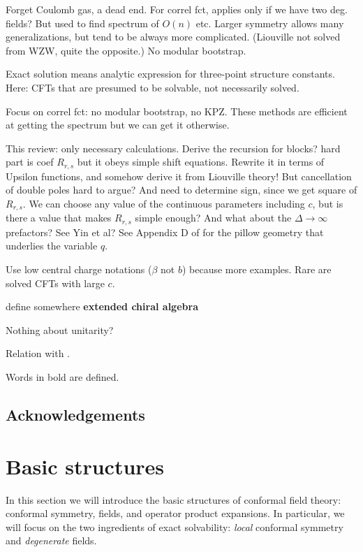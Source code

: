 \documentclass[12pt, a4paper]{article}
\theoremstyle{break}
\begin{document}
Forget Coulomb gas, a dead end. For correl fct, applies only if we have two deg. fields? But used to find spectrum of $O(n)$ etc. Larger symmetry allows many generalizations, but tend to be always more complicated. (Liouville not solved from WZW, quite the opposite.) No modular bootstrap. 

Exact solution means analytic expression for three-point structure constants. Here: CFTs that are presumed to be solvable, not necessarily solved. 

Focus on correl fct: no modular bootstrap, no KPZ. These methods are efficient at getting the spectrum but we can get it otherwise. 

This review: only necessary calculations. Derive the recursion for blocks? hard part is coef $R_{r,s}$ but it obeys simple shift equations. Rewrite it in terms of Upsilon functions, and somehow derive it from Liouville theory! But cancellation of double poles hard to argue? And need to determine sign, since we get square of $R_{r,s}$. We can choose any value of the continuous parameters including $c$, but is there a value that makes $R_{r,s}$ simple enough? And what about the $\Delta\to\infty$ prefactors? See Yin et al? See Appendix D of \cite{msz15} for the pillow geometry that underlies the variable $q$.

Use low central charge notations ($\beta$ not $b$) because more examples. Rare are solved CFTs with large $c$.

define somewhere \textbf{extended chiral algebra}

Nothing about unitarity?

Relation with \cite{rib16}.

Words in bold are defined.

\subsection*{Acknowledgements}



\section{Basic structures}

In this section we will introduce the basic structures of conformal field theory: conformal symmetry, fields, and operator product expansions. In particular, we will focus on the two ingredients of exact solvability: \textit{local} conformal symmetry and \textit{degenerate} fields. 
\end{document}
